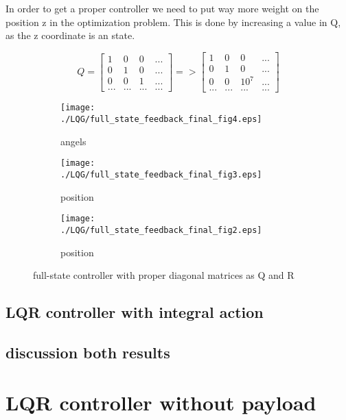 In order to get a proper controller we need to put way more weight on the position z in the optimization problem. This is done by increasing a value in Q, as the z coordinate is an state. 

$$ 
Q=
\begin{bmatrix}
1 & 0 & 0 & ... \\
0 & 1 & 0 & ...\\
0 & 0 & 1 & ... \\
... & ... & ... & ... 
\end{bmatrix}
=>
\begin{bmatrix}
1 & 0 & 0 & ...\\
0 & 1 & 0 & ...\\
0 & 0 & 10^{7} & ... \\
... & ... & ... & ... 
\end{bmatrix}
$$

\begin{figure}[H]
	\centering
	\begin{subfigure}[b]{0.3\textwidth}
		\texttt{[image: ./LQG/full\_state\_feedback\_final\_fig4.eps]}
		\caption{angels}
	\end{subfigure}
	\begin{subfigure}[b]{0.3\textwidth}
		\texttt{[image: ./LQG/full\_state\_feedback\_final\_fig3.eps]}
		\caption{position}
	\end{subfigure}
	\begin{subfigure}[b]{0.3\textwidth}
		\texttt{[image: ./LQG/full\_state\_feedback\_final\_fig2.eps]}
		\caption{position}
	\end{subfigure}
	\caption{full-state controller with proper diagonal matrices as Q and R}\label{fig:full-state controller with proper diagonal matrices as Q and R}
\end{figure}
\subsection{LQR controller with integral action}

\subsection{discussion both results}
\section{LQR controller without payload}
